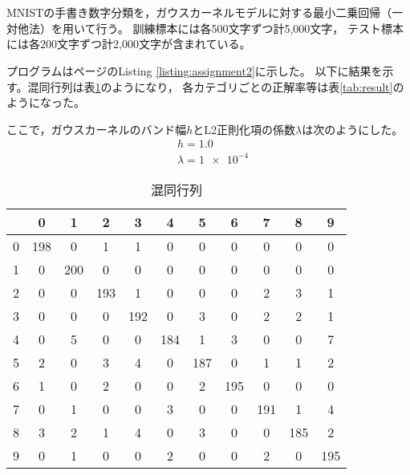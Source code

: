 \documentclass[class=jsarticle, crop=false, dvipdfmx, fleqn]{standalone}
\begin{document}
\section{}

MNISTの手書き数字分類を，ガウスカーネルモデルに対する最小二乗回帰（一対他法）を用いて行う。
訓練標本には各500文字ずつ計5,000文字，
テスト標本には各200文字ずつ計2,000文字が含まれている。

プログラムは\pageref{listing:assignment2}ページのListing \ref{listing:assignment2}に示した。
以下に結果を示す。混同行列は表\ref{tab:confusion_matrix}のようになり，
各カテゴリごとの正解率等は表\ref{tab:result}のようになった。

ここで，ガウスカーネルのバンド幅\(h\)とL2正則化項の係数\(\lambda\)は次のようにした。
\begin{align}
    & h = 1.0 \\
    & \lambda = \num{1e-4}
\end{align}

\begin{table}[H]
	\centering
	\caption{混同行列}
	\begin{tabular}{|c||cccccccccc|} \hline
			& 0 & 1 & 2 & 3 & 4 & 5 & 6 & 7 & 8 & 9 \\ \hline\hline
		0     & 198 & 0 & 1 & 1 & 0 & 0 & 0 & 0 & 0 & 0 \\
		1     & 0 & 200 & 0 & 0 & 0 & 0 & 0 & 0 & 0 & 0 \\
		2     & 0 & 0 & 193 & 1 & 0 & 0 & 0 & 2 & 3 & 1 \\
		3     & 0 & 0 & 0 & 192 & 0 & 3 & 0 & 2 & 2 & 1 \\
		4     & 0 & 5 & 0 & 0 & 184 & 1 & 3 & 0 & 0 & 7 \\
		5     & 2 & 0 & 3 & 4 & 0 & 187 & 0 & 1 & 1 & 2 \\
		6     & 1 & 0 & 2 & 0 & 0 & 2 & 195 & 0 & 0 & 0 \\
		7     & 0 & 1 & 0 & 0 & 3 & 0 & 0 & 191 & 1 & 4 \\
		8     & 3 & 2 & 1 & 4 & 0 & 3 & 0 & 0 & 185 & 2 \\
		9     & 0 & 1 & 0 & 0 & 2 & 0 & 0 & 2 & 0 & 195 \\
		\hline
	\end{tabular}
	\label{tab:confusion_matrix}
\end{table}
\end{document}
